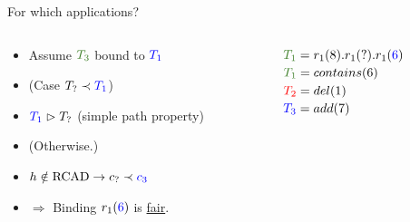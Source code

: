 \begin{frame}{For which applications?}

  \begin{columns}
    \begin{column}{0.6\textwidth}
      \begin{itemize}
      \item[] Assume $\tThree$ bound to $\tOne$
      \item[] (Case $T_? \hb \tOne$)
      \item[] \hspace{1em} $\tOne \depends T_?$ (simple path property)
      \item[] (Otherwise.)
      \item[] \hspace{1em} $h \notin \RCAD \implies c_? \hb {\color{blue}{c_3}}$
      \item[] $\Rightarrow$ Binding $r_1({\color{blue}{6}})$ is \underline{fair}.
      \end{itemize}      
    \end{column}
    \begin{column}{0.3\textwidth}
      \begin{figure}[!h]
        \centering
        \fontsize{8}{11}\selectfont
      \end{figure}
      ${\color{OliveGreen}{T_1}}=r_1(8).r_1(?).r_1({\color{blue}{6}})$\\
      \bigskip
      ${\color{OliveGreen}{T_1}}=contains(6)$ \\
      ${\color{red}{T_2}}=del(1)$ \\
      ${\color{blue}{T_3}}=add(7)$
    \end{column}
  \end{columns}
  
\end{frame}



